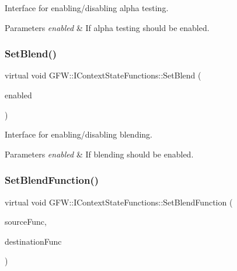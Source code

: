 Interface for enabling/disabling alpha testing. 


\begin{DoxyParams}{Parameters}
{\em enabled} & If alpha testing should be enabled. \\
\hline
\end{DoxyParams}
\mbox{\label{class_g_f_w_1_1_i_context_state_functions_a801cddb223ed75c8a6a8453d35780e2e}} 
\subsubsection{\texorpdfstring{Set\+Blend()}{SetBlend()}}
{\footnotesize\ttfamily virtual void G\+F\+W\+::\+I\+Context\+State\+Functions\+::\+Set\+Blend (\begin{DoxyParamCaption}\item[{bool}]{enabled }\end{DoxyParamCaption})\hspace{0.3cm}{\ttfamily [pure virtual]}}



Interface for enabling/disabling blending. 


\begin{DoxyParams}{Parameters}
{\em enabled} & If blending should be enabled. \\
\hline
\end{DoxyParams}
\mbox{\label{class_g_f_w_1_1_i_context_state_functions_aa551a7b37b0a3cfc743f045ce68e7825}} 
\subsubsection{\texorpdfstring{Set\+Blend\+Function()}{SetBlendFunction()}}
{\footnotesize\ttfamily virtual void G\+F\+W\+::\+I\+Context\+State\+Functions\+::\+Set\+Blend\+Function (\begin{DoxyParamCaption}\item[{\hyperlink{namespace_g_f_w_ac19434e926d01e02140f07e74ff36f3c}{Blend\+Function}}]{source\+Func,  }\item[{\hyperlink{namespace_g_f_w_ac19434e926d01e02140f07e74ff36f3c}{Blend\+Function}}]{destination\+Func }\end{DoxyParamCaption})\hspace{0.3cm}{\ttfamily [pure virtual]}}




